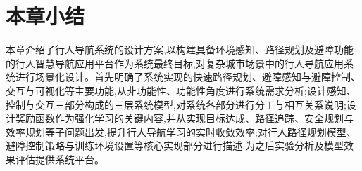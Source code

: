 \section{本章小结}

本章介绍了行人导航系统的设计方案,以构建具备环境感知、路径规划及避障功能的行人智慧导航应用平台作为系统最终目标,对复杂城市场景中的行人导航应用系统进行场景化设计。首先明确了系统实现的快速路径规划、避障感知与避障控制、交互与可视化等主要功能,从非功能性、功能性角度进行系统需求分析;设计感知、控制与交互三部分构成的三层系统模型,对系统各部分进行分工与相互关系说明;设计奖励函数作为强化学习的关键内容,并从实现目标达成、路径追踪、安全规划与效率规划等子问题出发,提升行人导航学习的实时收敛效率;对行人路径规划模型、避障控制策略与训练环境设置等核心实现部分进行描述,为之后实验分析及模型效果评估提供系统平台。

	
